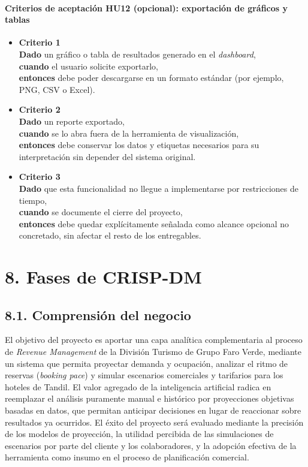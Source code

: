 \documentclass[
11pt, %
]{charter}
\begin{document}
\paragraph{Criterios de aceptación HU12 (opcional): exportación de gráficos y tablas}
\begin{itemize}
  \item \textbf{Criterio 1} \\
  \textbf{Dado} un gráfico o tabla de resultados generado en el \textit{dashboard}, \\
  \textbf{cuando} el usuario solicite exportarlo, \\
  \textbf{entonces} debe poder descargarse en un formato estándar (por ejemplo, PNG, CSV o Excel).

  \item \textbf{Criterio 2} \\
  \textbf{Dado} un reporte exportado, \\
  \textbf{cuando} se lo abra fuera de la herramienta de visualización, \\
  \textbf{entonces} debe conservar los datos y etiquetas necesarios para su interpretación sin depender del sistema original.

  \item \textbf{Criterio 3} \\
  \textbf{Dado} que esta funcionalidad no llegue a implementarse por restricciones de tiempo, \\
  \textbf{cuando} se documente el cierre del proyecto, \\
  \textbf{entonces} debe quedar explícitamente señalada como alcance opcional no concretado, sin afectar el resto de los entregables.
\end{itemize}

\section{8. Fases de CRISP-DM}

\subsection*{8.1. Comprensión del negocio}
El objetivo del proyecto es aportar una capa analítica complementaria al proceso de \textit{Revenue Management} de la División Turismo de Grupo Faro Verde, mediante un sistema que permita proyectar demanda y ocupación, analizar el ritmo de reservas (\textit{booking pace}) y simular escenarios comerciales y tarifarios para los hoteles de Tandil. El valor agregado de la inteligencia artificial radica en reemplazar el análisis puramente manual e histórico por proyecciones objetivas basadas en datos, que permitan anticipar decisiones en lugar de reaccionar sobre resultados ya ocurridos. El éxito del proyecto será evaluado mediante la precisión de los modelos de proyección, la utilidad percibida de las simulaciones de escenarios por parte del cliente y los colaboradores, y la adopción efectiva de la herramienta como insumo en el proceso de planificación comercial.
\end{document}

